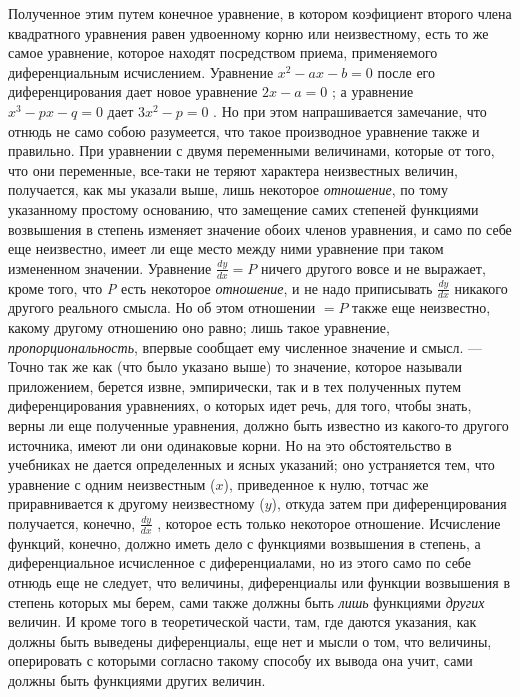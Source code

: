 {Полученное этим путем конечное уравнение, в котором коэфициент второго члена
квадратного уравнения равен удвоенному корню или неизвестному, есть то же
самое уравнение, которое находят посредством приема, применяемого
диференциальным исчислением. Уравнение  $x^2-\mathit{ax}-b=0$  после его
диференцирования дает новое уравнение  $2x-a=0$ ; а уравнение 
$x^3-\mathit{px}-q=0$  дает  $3x^2-p=0$ . Но при этом напрашивается
замечание, что отнюдь не само собою разумеется, что такое производное
уравнение также и правильно. При уравнении с двумя переменными величинами,
которые от того, что они переменные, все-таки не теряют характера
неизвестных величин, получается, как мы указали выше, лишь некоторое
{\em отношение}, по тому указанному простому основанию,
что замещение самих степеней функциями возвышения в степень изменяет
значение обоих членов уравнения, и само по себе еще неизвестно, имеет ли
еще место между ними уравнение при таком измененном значении. Уравнение 
$\frac{\mathit{dy}}{\mathit{dx}}=P$  ничего другого вовсе и не выражает,
кроме того, что {\em P} есть некоторое
{\em отношение}, и не надо приписывать 
$\frac{\mathit{dy}}{\mathit{dx}}$ никакого другого реального смысла. Но об
этом отношении  $=P$  также еще неизвестно, какому другому отношению оно
равно; лишь такое уравнение, {\em пропорциональность},
впервые сообщает ему численное значение и смысл. — Точно так же как (что
было указано выше) то значение, которое называли приложением, берется
извне, эмпирически, так и в тех полученных путем диференцирования
уравнениях, о которых идет речь, для того, чтобы знать, верны ли еще
полученные уравнения, должно быть известно из какого-то другого источника,
имеют ли они одинаковые корни. Но на это обстоятельство в учебниках не
дается определенных и ясных указаний; оно устраняется тем, что уравнение с
одним неизвестным ($x$), приведенное к нулю, тотчас
же приравнивается к другому неизвестному ($y$),
откуда затем при диференцирования получается, конечно, 
$\frac{\mathit{dy}}{\mathit{dx}}$ , которое есть только некоторое
отношение. Исчисление функций, конечно, должно иметь дело с функциями
возвышения в степень, а диференциальное исчисленное с диференциалами, но из
этого само по себе отнюдь еще не следует, что величины, диференциалы или
функции возвышения в степень которых мы берем, сами также должны быть
{\em лишь} функциями {\em других}
величин. И кроме того в теоретической части, там, где даются указания, как
должны быть выведены диференциалы, еще нет и мысли о том, что величины,
оперировать с которыми согласно такому способу их вывода она учит, сами
должны быть функциями других величин.

}
